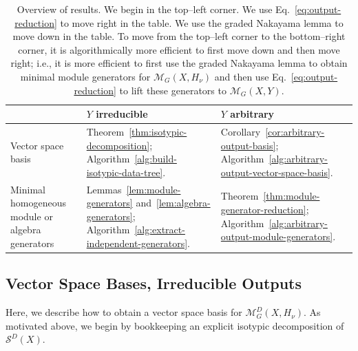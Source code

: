 \documentclass[11pt]{article}
\newcommand{\scM}{\mathcal{M}}
\newcommand{\scS}{\mathcal{S}}
\theoremstyle{definition}
\begin{document}
\begin{table}[htbp]
  \centering
  \small
  \setlength{\tabcolsep}{5pt}
  \begin{tabular}{>{\raggedright\arraybackslash}p{}
    >{\raggedright\arraybackslash}p{}
    >{\raggedright\arraybackslash}p{}}
    \toprule
    & $Y$ irreducible & $Y$ arbitrary \\
    \midrule
    Vector space basis
    &
    Theorem~\ref{thm:isotypic-decomposition}; Algorithm~\ref{alg:build-isotypic-data-tree}.
    &
    Corollary~\ref{cor:arbitrary-output-basis}; Algorithm~\ref{alg:arbitrary-output-vector-space-basis}.
    \\[0.5em]
    Minimal homogeneous module or algebra generators
    &
    Lemmas~\ref{lem:module-generators} and~\ref{lem:algebra-generators}; Algorithm~\ref{alg:extract-independent-generators}.
    &
    Theorem~\ref{thm:module-generator-reduction}; Algorithm~\ref{alg:arbitrary-output-module-generators}.
    \\
    \bottomrule
  \end{tabular}
  \caption{Overview of results.
  We begin in the top--left corner.
  We use Eq.~\eqref{eq:output-reduction} to move right in the table.
  We use the graded Nakayama lemma to move down in the table.
  To move from the top--left corner to the bottom--right corner, it is algorithmically more efficient to first move down and then move right; i.e., it is more efficient to first use the graded Nakayama lemma to obtain minimal module generators for $\scM_G(X,H_\nu)$ and then use Eq.~\eqref{eq:output-reduction} to lift these generators to $\scM_G(X,Y)$.}
  \label{tab:main-results-guide}
\end{table}


\subsection{Vector Space Bases, Irreducible Outputs}\label{sec:irreducible-bases}

Here, we describe how to obtain a vector space basis for $\scM_G^D(X,H_\nu)$. As motivated above, we begin by bookkeeping an explicit isotypic decomposition of $\scS^D(X)$.
\end{document}
